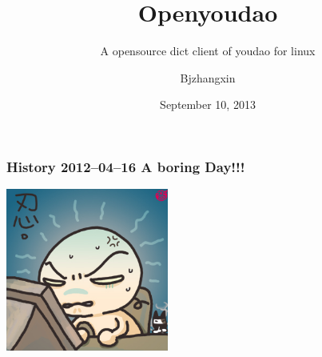 \documentclass[10pt]{beamer}
\subtitle{A opensource dict client of youdao for linux}
\author[NetEase]{Bjzhangxin}
\title{Openyoudao}
\date{September 10, 2013}
\begin{document}
\begin{CJK*}{UTF8}{song} %
\begin{frame}[plain]
  \titlepage
\end{frame}

\begin{frame}
  \frametitle{\Large{History 2012--04--16 A boring Day!!!}}

\begin{center} 
  \includegraphics[width=0.4\textwidth]{pic1.jpg}
\end{center}
\medskip
\quad
\qquad


\end{frame}
\end{CJK*}
\end{document}
